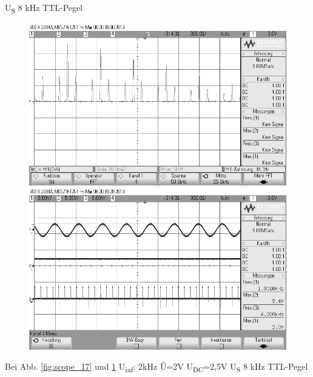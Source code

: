 \documentclass[12pt,a4paper]{scrartcl}
\begin{document}
        U\textsubscript{S} 8 kHz TTL-Pegel\\
     \begin{figure}[htbp]
    \begin{minipage}{0.48\textwidth}
     \centering
      \includegraphics[width=1\textwidth]{scope_17}
      \caption{}
      \label{fig:scope_17}
    \end{minipage}\hfill
    \begin{minipage}{0.48\textwidth}
     \centering
      \includegraphics[width=1\textwidth]{scope_18}
      \caption{}
      \label{fig:scope_18}
    \end{minipage}
  \end{figure} 
   Bei Abb. \ref{fig:scope_17} und \ref{fig:scope_18} U\textsubscript{inf}:  2kHz \^{U}=2V
        U\textsubscript{DC}=2,5V
        U\textsubscript{S} 8 kHz TTL-Pegel
        \newpage
\end{document}
